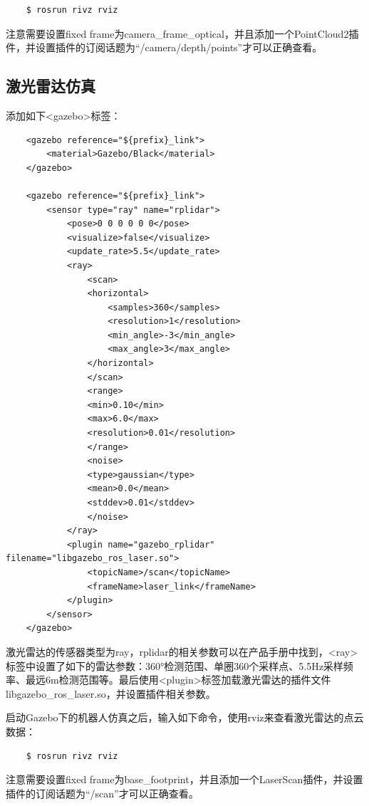 \documentclass[10pt, oneside]{book}
\begin{document}
\begin{verbatim}
    $ rosrun rivz rviz
\end{verbatim}

注意需要设置fixed frame为camera\_frame\_optical，并且添加一个PointCloud2插件，并设置插件的订阅话题为“/camera/depth/points”才可以正确查看。

\subsection{激光雷达仿真}

添加如下<gazebo>标签：

\begin{verbatim}
    <gazebo reference="${prefix}_link">
        <material>Gazebo/Black</material>
    </gazebo>

    <gazebo reference="${prefix}_link">
        <sensor type="ray" name="rplidar">
            <pose>0 0 0 0 0 0</pose>
            <visualize>false</visualize>
            <update_rate>5.5</update_rate>
            <ray>
                <scan>
                <horizontal>
                    <samples>360</samples>
                    <resolution>1</resolution>
                    <min_angle>-3</min_angle>
                    <max_angle>3</max_angle>
                </horizontal>
                </scan>
                <range>
                <min>0.10</min>
                <max>6.0</max>
                <resolution>0.01</resolution>
                </range>
                <noise>
                <type>gaussian</type>
                <mean>0.0</mean>
                <stddev>0.01</stddev>
                </noise>
            </ray>
            <plugin name="gazebo_rplidar" filename="libgazebo_ros_laser.so">
                <topicName>/scan</topicName>
                <frameName>laser_link</frameName>
            </plugin>
        </sensor>
    </gazebo>
\end{verbatim}

激光雷达的传感器类型为ray，rplidar的相关参数可以在产品手册中找到，<ray>标签中设置了如下的雷达参数：360°检测范围、单圈360个采样点、5.5Hz采样频率、最远6m检测范围等。最后使用<plugin>标签加载激光雷达的插件文件libgazebo\_ros\_laser.so，并设置插件相关参数。

启动Gazebo下的机器人仿真之后，输入如下命令，使用rviz来查看激光雷达的点云数据：

\begin{verbatim}
    $ rosrun rivz rviz
\end{verbatim}

注意需要设置fixed frame为base\_footprint，并且添加一个LaserScan插件，并设置插件的订阅话题为“/scan”才可以正确查看。
\end{document}
